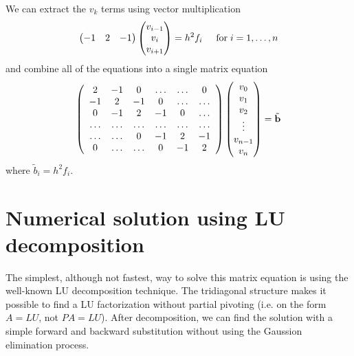 \documentclass[a4paper]{article}
\begin{document}
We can extract the $v_k$ terms using vector multiplication
\[
  \begin{pmatrix}
    -1 & 2 & -1
  \end{pmatrix}
  \begin{pmatrix}
    v_{i-1} \\ v_i \\ v_{i+1}
  \end{pmatrix}
  =
  h^2 f_i
  \hspace{0.5cm}
  \mathrm{for} \hspace{0.1cm} i=1,\dots, n
\]
and combine all of the equations into a single matrix equation
\begin{equation}
    \left(\begin{array}{cccccc}
                           2& -1& 0 &\dots   & \dots &0 \\
                           -1 & 2 & -1 &0 &\dots &\dots \\
                           0 &-1 &2 & -1 & 0 & \dots \\
                           \dots & \dots   & \dots &\dots   &\dots & \dots \\
                           \dots &\dots   & 0 &-1 &2& -1 \\
                           0&\dots    & \dots & 0  &-1 & 2 \\
                      \end{array} \right)
    \begin{pmatrix}
      v_0 \\ v_1 \\ v_2 \\ \vdots \\ v_{n-1} \\ v_n
    \end{pmatrix}
    = \tilde{\bf b}
  \label{eq:matrix-eq}
\end{equation}
where $\tilde{b}_i = h^2 f_i$.

\section{Numerical solution using LU decomposition}

The simplest, although not fastest, way to solve this matrix equation is
using the well-known LU decomposition technique. The tridiagonal
structure makes it possible to find a LU factorization without partial
pivoting (i.e. on the form $A = LU$, not $PA = LU$). After
decomposition, we can find the solution with a simple forward and
backward substitution without using the Gaussion elimination process.
\end{document}

